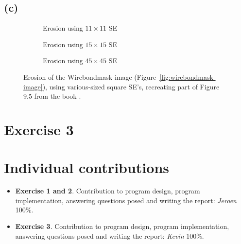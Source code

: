 \documentclass{article}
\begin{document}
\subsection*{(c)}
\begin{figure}[H]
     \centering
     \begin{subfigure}[b]{0.3\textwidth}
         \centering
         
         \caption{Erosion using $11 \times 11$ SE}
         \label{fig:book9.5figure-wirebondmask-image-11x11}
     \end{subfigure}
     \hfill
     \begin{subfigure}[b]{0.3\textwidth}
         \centering
         
         \caption{Erosion using $15 \times 15$ SE}
         \label{fig:book9.5figure-wirebondmask-image-15x15}
     \end{subfigure}
     \hfill
     \begin{subfigure}[b]{0.3\textwidth}
         \centering
         
         \caption{Erosion using $45 \times 45$ SE}
         \label{fig:book9.5figure-wirebondmask-image-45x45}
     \end{subfigure}
     
    \caption{Erosion of the Wirebondmask image (Figure~\ref{fig:wirebondmask-image}), using various-sized square SE's, recreating part of Figure 9.5 from the book \citep{gonzalez2008digital}.}
    \label{fig:book9.5figure}
\end{figure}

\section*{Exercise 3}


\section*{Individual contributions}
\begin{itemize}
    \item \textbf{Exercise 1 and 2}. Contribution to program design, program implementation, answering questions posed and writing the report: \textit{Jeroen} 100\%.
    \item \textbf{Exercise 3}. Contribution to program design, program implementation, answering questions posed and writing the report: \textit{Kevin} 100\%.
\end{itemize}
\end{document}
